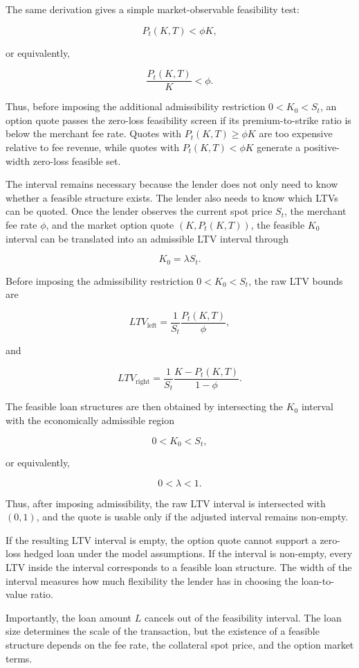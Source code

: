 \documentclass[11pt]{article}
\begin{document}
The same derivation gives a simple market-observable feasibility test:

$$
P_t(K,T)<\phi K,
$$

or equivalently,

$$
\frac{P_t(K,T)}{K}<\phi.
$$

Thus, before imposing the additional admissibility restriction $0<K_0<S_t$, an option quote passes the zero-loss feasibility screen if its premium-to-strike ratio is below the merchant fee rate. Quotes with $P_t(K,T)\ge \phi K$ are too expensive relative to fee revenue, while quotes with $P_t(K,T)<\phi K$ generate a positive-width zero-loss feasible set.

The interval remains necessary because the lender does not only need to know whether a feasible structure exists. The lender also needs to know which LTVs can be quoted. Once the lender observes the current spot price $S_t$, the merchant fee rate $\phi$, and the market option quote $(K,P_t(K,T))$, the feasible $K_0$ interval can be translated into an admissible LTV interval through

$$
K_0=\lambda S_t.
$$

Before imposing the admissibility restriction $0<K_0<S_t$, the raw LTV bounds are

$$
LTV_{\text{left}}
=
\frac{1}{S_t}\frac{P_t(K,T)}{\phi},
$$

and

$$
LTV_{\text{right}}
=
\frac{1}{S_t}\frac{K-P_t(K,T)}{1-\phi}.
$$

The feasible loan structures are then obtained by intersecting the $K_0$ interval with the economically admissible region

$$
0<K_0<S_t,
$$

or equivalently,

$$
0<\lambda<1.
$$

Thus, after imposing admissibility, the raw LTV interval is intersected with $(0,1)$, and the quote is usable only if the adjusted interval remains non-empty.

If the resulting LTV interval is empty, the option quote cannot support a zero-loss hedged loan under the model assumptions. If the interval is non-empty, every LTV inside the interval corresponds to a feasible loan structure. The width of the interval measures how much flexibility the lender has in choosing the loan-to-value ratio.

Importantly, the loan amount $L$ cancels out of the feasibility interval. The loan size determines the scale of the transaction, but the existence of a feasible structure depends on the fee rate, the collateral spot price, and the option market terms.
\end{document}
